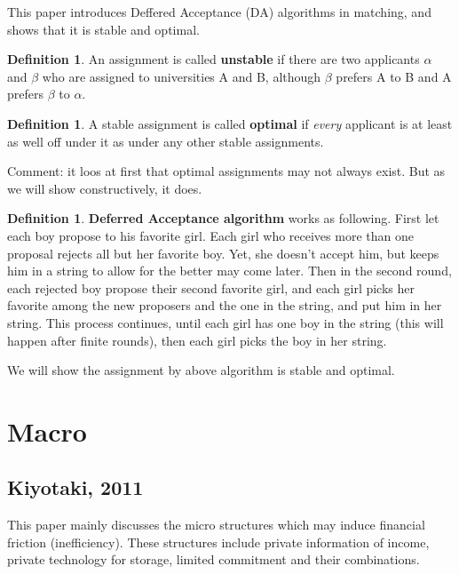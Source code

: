 \documentclass{book}
\theoremstyle{plain}
\theoremstyle{definition}
\newtheorem{defn}[thm]{Definition} %
\begin{document}
This paper introduces Deffered Acceptance (DA) algorithms in matching, and shows that it is stable and optimal.

\begin{defn}
An assignment is called \textbf{unstable} if there are two applicants $\alpha$ and $\beta$ who are assigned to universities A and B, although $\beta$ prefers A to B and A prefers $\beta$ to $\alpha$.
\end{defn}

\begin{defn}
A stable assignment is called \textbf{optimal} if \textit{every} applicant is at least as well off under it as under any other stable assignments.
\end{defn}

Comment: it loos at first that optimal assignments may not always exist. But as we will show constructively, it does.

\begin{defn}
\textbf{Deferred Acceptance algorithm} works as following. First let each boy propose to his favorite girl. Each girl who receives more than one proposal rejects all but her favorite boy. Yet, she doesn't accept him, but keeps him in a string to allow for the better may come later. Then in the second round, each rejected boy propose their second favorite girl, and each girl picks her favorite among the new proposers and the one in the string, and put him in her string. This process continues, until each girl has one boy in the string (this will happen after finite rounds), then each girl picks the boy in her string.
\end{defn}

We will show the assignment by above algorithm is stable and optimal.









\chapter{Macro} %
\label{cha:chapter_name}

\section{Kiyotaki, 2011} %
\label{sec:kiyotaki_2011}

\textbf{}

This paper mainly discusses the micro structures which may induce financial friction (inefficiency). These structures include private information of income, private technology for storage, limited commitment and their combinations.








\renewcommand\refname{Reference}


\end{document}
